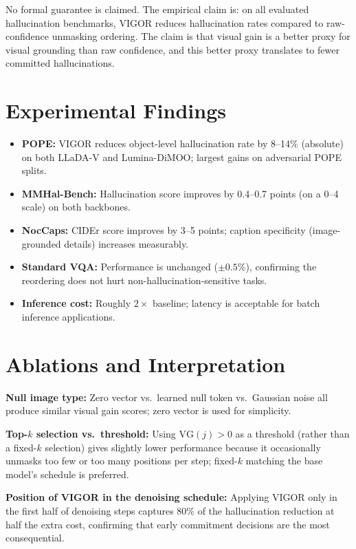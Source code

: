 \documentclass[10pt,twocolumn]{article}
\begin{document}
No formal guarantee is claimed. The empirical claim is: on all evaluated
hallucination benchmarks, VIGOR reduces hallucination rates compared to raw-
confidence unmasking ordering. The claim is that visual gain is a better proxy
for visual grounding than raw confidence, and this better proxy translates to
fewer committed hallucinations.

\section{Experimental Findings}

\begin{itemize}[itemsep=2pt,parsep=0pt]
  \item \textbf{POPE:} VIGOR reduces object-level hallucination rate by
    8--14\% (absolute) on both LLaDA-V and Lumina-DiMOO; largest gains on
    adversarial POPE splits.
  \item \textbf{MMHal-Bench:} Hallucination score improves by 0.4--0.7 points
    (on a 0--4 scale) on both backbones.
  \item \textbf{NocCaps:} CIDEr score improves by 3--5 points; caption
    specificity (image-grounded details) increases measurably.
  \item \textbf{Standard VQA:} Performance is unchanged ($\pm 0.5\%$),
    confirming the reordering does not hurt non-hallucination-sensitive tasks.
  \item \textbf{Inference cost:} Roughly $2\times$ baseline; latency is
    acceptable for batch inference applications.
\end{itemize}

\section{Ablations and Interpretation}

\textbf{Null image type:} Zero vector vs.\ learned null token vs.\ Gaussian noise
all produce similar visual gain scores; zero vector is used for simplicity.

\textbf{Top-$k$ selection vs.\ threshold:} Using $\text{VG}(j) > 0$ as a threshold
(rather than a fixed-$k$ selection) gives slightly lower performance because it
occasionally unmasks too few or too many positions per step; fixed-$k$ matching
the base model's schedule is preferred.

\textbf{Position of VIGOR in the denoising schedule:} Applying VIGOR only in the
first half of denoising steps captures 80\% of the hallucination reduction at
half the extra cost, confirming that early commitment decisions are the most
consequential.
\end{document}
